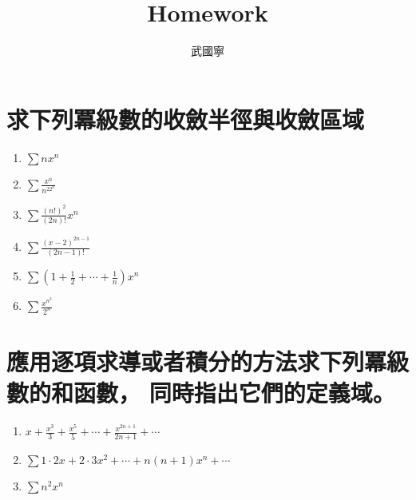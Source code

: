 \documentclass[a4paper,12pt]{article}
\begin{document}
\begin{CJK*}{UTF8}{bsmi}
\newtheorem{theorem}{定理}
\newtheorem{lemma}{引理}
\newtheorem{definition}{定義}
\newtheorem{example}{例子}
\newtheorem{corollary}{推論}
\newtheorem{remark}{注}
\let\oldref\ref
\renewcommand{\ref}[1]{\rm{(\oldref{#1})}}
\renewcommand{\headrulewidth}{0.4pt}
\renewcommand{\footrulewidth}{0.4pt}

\title{Homework}
\author{武國寧}
\date{}
\maketitle
\section{求下列冪級數的收斂半徑與收斂區域}
    \begin{enumerate}[label={\rm(\arabic*)}]
        \item $\displaystyle \sum nx^n$
        \item $\displaystyle \sum \frac{x^n}{n^22^n}$
        \item $\displaystyle \sum \frac{(n!)^2}{(2n)!} x^n$
        \item $\displaystyle \sum \frac{(x-2)^{2n-1}}{(2n-1)!} $
        \item $\displaystyle \sum \left(1 + \frac{1}{2} + \cdots + \frac{1}{n}\right)x^n $
        \item $\displaystyle \sum \frac{x^{n^2}}{2^n}$
    \end{enumerate}

\section{應用逐項求導或者積分的方法求下列冪級數的和函數，
         同時指出它們的定義域。}
    \begin{enumerate}[label={\rm(\arabic*)}]
        \item $\displaystyle x + \frac{x^3}{3} + \frac{x^5}{5} + \cdots + \frac{x^{2n+1}}{2n+1} + \cdots$
        \item $\displaystyle \sum 1\cdot 2x + 2\cdot 3x^2 + \cdots + n(n+1)x^n + \cdots $
        \item $\displaystyle \sum n^2x^n$
    \end{enumerate}
\end{CJK*}
\end{document}
